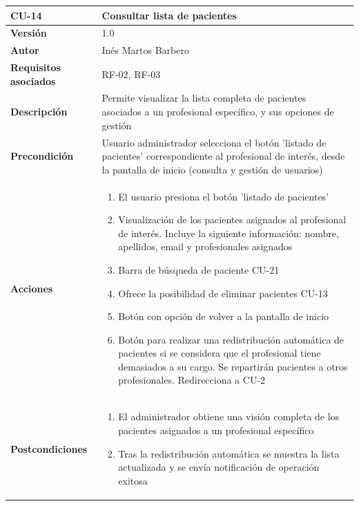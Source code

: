 \begin{table}[p]
	\centering
	\begin{tabularx}{\linewidth}{ p{} p{} }
		\toprule
		\textbf{CU-14}    & \textbf{Consultar lista de pacientes}\\
		\toprule
		\textbf{Versión}              & 1.0    \\
		\textbf{Autor}                & Inés Martos Barbero \\
		\textbf{Requisitos asociados} & RF-02, RF-03 \\
		\textbf{Descripción}          & Permite visualizar la lista completa de pacientes asociados a un profesional específico, y sus opciones de gestión \\
		\textbf{Precondición}         & Usuario administrador selecciona el botón 'listado de pacientes' correspondiente al profesional de interés, desde la pantalla de inicio (consulta y gestión de usuarios) \\
		\textbf{Acciones}             &
		\begin{enumerate}
			\def\labelenumi{\arabic{enumi}.}
			\tightlist
			\item El usuario presiona el botón 'listado de pacientes'
            \item Visualización de los pacientes asignados al profesional de interés. Incluye la siguiente información: nombre, apellidos, email y profesionales asignados
            \item Barra de búsqueda de paciente CU-21
			\item Ofrece la posibilidad de eliminar pacientes CU-13
            \item Botón con opción de volver a la pantalla de inicio
            \item Botón para realizar una redistribución automática de pacientes si se considera que el profesional tiene demasiados a su cargo. Se repartirán pacientes a otros profesionales. Redirecciona a CU-2
		\end{enumerate}\\
		\textbf{Postcondiciones}        & 
        \begin{enumerate}
			\def\labelenumi{\arabic{enumi}.}
			\tightlist
			\item El administrador obtiene una visión completa de los pacientes asignados a un profesional específico
			\item Tras la redistribución automática se muestra la lista actualizada y se envía notificación de operación exitosa

\end{enumerate}
\end{tabularx}
\end{table}

